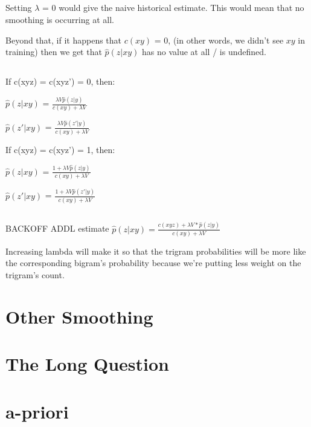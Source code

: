 \documentclass[12pt, letterpaper]{article}
\begin{document}
\subsection{}

Setting $\lambda$ = 0 would give the naive historical estimate. This would mean that no smoothing is occurring at all. 

Beyond that, if it happens that $c(xy)$ = 0, (in other words, we didn't see $xy$ in training) then we get that $\hat{p}(z|xy)$ has no value at all / is undefined.

\subsection{}

If c(xyz) = c(xyz') = 0, then:

$\hat{p}(z|xy)$ = $\frac{\lambda V \hat{p}(z|y)}{c(xy) + \lambda V}$

$\hat{p}(z'|xy)$ = $\frac{\lambda V \hat{p}(z'|y)}{c(xy) + \lambda V}$

If c(xyz) = c(xyz') = 1, then:

$\hat{p}(z|xy)$ = $\frac{1 + \lambda V \hat{p}(z|y)}{c(xy) + \lambda V}$

$\hat{p}(z'|xy)$ = $\frac{1 + \lambda V \hat{p}(z'|y)}{c(xy) + \lambda V}$

\subsection{}

BACKOFF ADDL estimate $\hat{p}(z | xy) = \frac{c(xyz) + \lambda V * \hat{p}(z|y)}{c(xy) + \lambda V}$

Increasing lambda will make it so that the trigram probabilities will be more like the corresponding bigram's probability because we're putting less weight on the trigram's count.

\section{Other Smoothing}

\section{The Long Question}

\section{a-priori}
\end{document}
